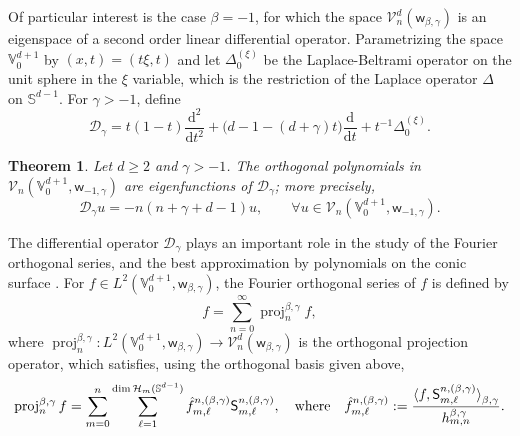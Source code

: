 \documentclass{amsart}
\newtheorem{thm}{Theorem}[section]
\theoremstyle{remark}
\def\la{{\langle}}
\def\ra{{\rangle}}
\def\d{\mathrm{d}}
\def\sph{{\mathbb{S}^{d-1}}}
\def\sw{{\mathsf w}}
\def\sS{{\mathsf S}}
\def\b{{\beta}}
\def\g{{\gamma}}
\def\la{{\langle}}
\def\ra{{\rangle}}
\def\CD{{\mathcal D}}
\def\CH{{\mathcal H}}
\def\CV{{\mathcal V}}
\def\VV{{\mathbb V}}
\def\proj{\operatorname{proj}}
\begin{document}
Of particular interest is the case $\b = -1$, for which the space $\CV_n^d(\sw_{\b,\g})$ is an eigenspace
of a second order linear differential operator. Parametrizing the space $\VV_0^{d+1}$ by $(x,t) = (t\xi, t)$
and let $\Delta_0^{(\xi)}$ be the Laplace-Beltrami operator on the unit sphere in the $\xi$ variable, which
is the restriction of the Laplace operator $\Delta$ on $\sph$. For $\g > -1$, define
\begin{equation} \label{eq:diff-op}
   \CD_\g =  t(1-t)\frac{\d^2}{\d t^2} + \big( d-1 - (d+\g)t \big) \frac{\d}{\d t}+ t^{-1} \Delta_0^{(\xi)}.
\end{equation}

\begin{thm}\label{thm:Jacobi-DE-V0}
Let $d\ge 2$ and $\g > -1$. The orthogonal polynomials in $\CV_n(\VV_0^{d+1}, \sw_{-1,\g})$ are eigenfunctions
of $\CD_{\g}$; more precisely,
\begin{equation}\label{eq:eigen-eqn}
    \CD_{\g} u =  -n (n+\g+d-1) u, \qquad \forall u \in \CV_n(\VV_0^{d+1}, \sw_{-1,\g}).
\end{equation}
\end{thm}

The differential operator $\CD_{\g}$ plays an important role in the study of the Fourier orthogonal series, 
and the best approximation by polynomials on the conic surface \cite{X21}. For $f \in L^2(\VV_0^{d+1}, \sw_{\b,\g})$,
the Fourier orthogonal series of $f$ is defined by
$$
  f = \sum_{n=0}^\infty \proj_n^{\b,\g} f,
$$
where $\proj_n^{\b,\g}: L^2(\VV_0^{d+1}, \sw_{\b,\g}) \rightarrow \CV_n^d(\sw_{\b,\g})$ is the orthogonal
projection operator, which satisfies, using the orthogonal basis given above,
$$
  \proj_n^{\b,\g} f = \sum_{m=0}^n \sum_{\ell=1}^{\dim \CH_m(\sph)}\hat f_{m,\ell}^{n, (\b,\g)} \sS_{m,\ell}^{n,(\b,\g)},
  \quad \hbox{where}\quad \hat f_{m,\ell}^{n, (\b,\g)} := \frac{\la f,  \sS_{m, \ell}^{n,(\b,\g)}\ra_{\b,\g}}{h_{m,n}^{\b,\g}}.
$$
\end{document}
